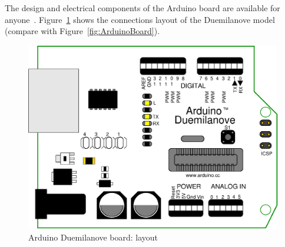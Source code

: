The design and electrical components of the Arduino board are available for anyone~\cite{Arduino}. Figure~\ref{fig:Arduino_schematics} shows the connections layout of the Duemilanove model (compare with Figure~\ref{fig:ArduinoBoard}).

\begin{figure}[htbp]
  \centering
  \includegraphics[width=0.7\linewidth]{figures/duemilanove_layout.eps}
  \caption{Arduino Duemilanove board: layout
  \label{fig:Arduino_schematics}}
\end{figure}


